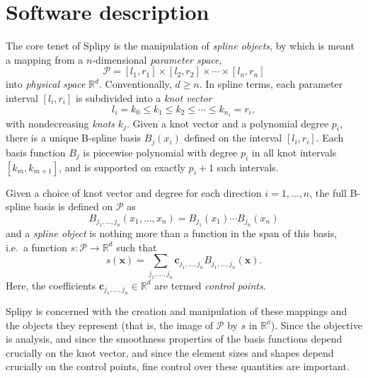 \documentclass[preprint,12pt, a4paper]{elsarticle}
\begin{document}
\section{Software description}
\label{sec:description}

The core tenet of Splipy is the manipulation of \emph{spline objects}, by which is meant a mapping from a $n$-dimensional \emph{parameter space},
\begin{equation}
  \label{eqn:paramspace}
  \mathcal{P} = [l_1, r_1] \times [l_2, r_2] \times \cdots \times [l_n, r_n]
\end{equation}
into \emph{physical space} $\mathbb{R}^d$.
Conventionally, $d \geq n$.
In spline terms, each parameter interval $[l_i, r_i]$ is subdivided into a \emph{knot vector}
\begin{equation}
  \label{eqn:knotvector}
  l_i = k_0 \leq k_1 \leq k_2 \leq \cdots \leq k_{n_i} = r_i,
\end{equation}
with nondecreasing \emph{knots} $k_j$.
Given a knot vector and a polynomial degree $p_i$, there is a unique B-spline basis $B_j(x_i)$ defined on the interval $[l_i, r_i]$.
Each basis function $B_j$ is piecewise polynomial with degree $p_i$ in all knot intervals $[k_m, k_{m+1}]$, and is supported on exactly $p_i+1$ such intervals.

Given a choice of knot vector and degree for each direction $i=1,\ldots,n$, the full B-spline basis is defined on $\mathcal{P}$ as
\begin{equation}
  \label{eqn:bspline-multi}
  B_{j_1,\ldots,j_n}(x_1,\ldots,x_n) = B_{j_1}(x_1) \cdots B_{j_n}(x_n)
\end{equation}
and a \emph{spline object} is nothing more than a function in the span of this basis, i.e.~a function $s: \mathcal{P} \to \mathbb{R}^d$ such that
\begin{equation}
  \label{eqn:splineobj}
  s(\bm x) = \sum_{j_1, \ldots, j_n} \bm c_{j_1, \ldots, j_n} B_{j_1, \ldots, j_n}(\bm x).
\end{equation}
Here, the coefficients $\bm c_{j_1, \ldots, j_n} \in \mathbb{R}^d$ are termed \emph{control points}.

Splipy is concerned with the creation and manipulation of these mappings and the objects they represent (that is, the image of $\mathcal{P}$ by $s$ in $\mathbb{R^d}$).
Since the objective is analysis, and since the smoothness properties of the basis functions depend crucially on the knot vector, and since the element sizes and shapes depend crucially on the control points, fine control over these quantities are important.
\end{document}
